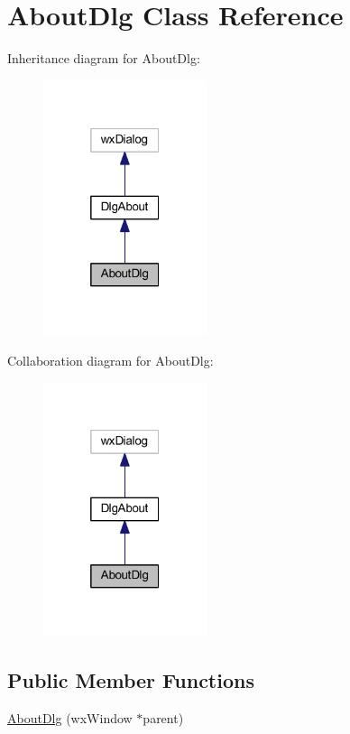 \hypertarget{class_about_dlg}{\section{About\-Dlg Class Reference}
\label{class_about_dlg}
}


Inheritance diagram for About\-Dlg\-:\nopagebreak
\begin{figure}[H]
\begin{center}
\leavevmode
\includegraphics[width=136pt]{class_about_dlg__inherit__graph}
\end{center}
\end{figure}


Collaboration diagram for About\-Dlg\-:\nopagebreak
\begin{figure}[H]
\begin{center}
\leavevmode
\includegraphics[width=136pt]{class_about_dlg__coll__graph}
\end{center}
\end{figure}
\subsection*{Public Member Functions}
\begin{DoxyCompactItemize}
\item 
\hyperlink{class_about_dlg_ac17a2e5d541346e2edabcddf043afa6e}{About\-Dlg} (wx\-Window $\ast$parent)
\end{DoxyCompactItemize}
